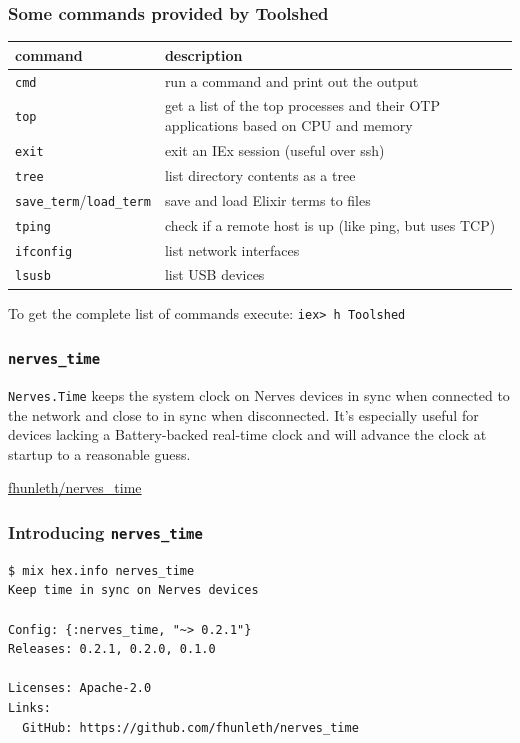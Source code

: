 \documentclass[10pt,xcolor=pdflatex,dvipsnames,table]{beamer}
\begin{document}
\begin{frame}
  \frametitle{Some commands provided by Toolshed}

  \begin{center}
  \begin{tabular}{|l|p{}|}\hline
    \textbf{command} & \textbf{description} \\ \hline
    \texttt{cmd} & run a command and print out the output \\
    \texttt{top} & get a list of the top processes and their OTP applications based on CPU and memory \\
    \texttt{exit} & exit an IEx session (useful over ssh) \\
    \texttt{tree} & list directory contents as a tree \\
    \texttt{save\_term}/\texttt{load\_term} & save and load Elixir terms to files \\
    \texttt{tping} & check if a remote host is up (like ping, but uses TCP) \\
    \texttt{ifconfig} & list network interfaces \\
    \texttt{lsusb} & list USB devices \\ \hline
  \end{tabular}
\end{center}

  To get the complete list of commands execute: \texttt{iex> h Toolshed}
\end{frame}

\begin{frame}[standout]
  \frametitle{\texttt{nerves\_time}}

  {\color{white}
  \texttt{Nerves.Time} keeps the system clock on Nerves devices in sync when
  connected to the network and close to in sync when disconnected. It's
  especially useful for devices lacking a Battery-backed real-time clock and
  will advance the clock at startup to a reasonable guess.

  \faGithub \hspace{1pt} \href{https://github.com/fhunleth/nerves_time}{fhunleth/nerves\_time}
  }

\end{frame}

\begin{frame}[fragile]
\frametitle{Introducing \texttt{nerves\_time}}

\begin{example}
\begin{verbatim}
$ mix hex.info nerves_time
Keep time in sync on Nerves devices

Config: {:nerves_time, "~> 0.2.1"}
Releases: 0.2.1, 0.2.0, 0.1.0

Licenses: Apache-2.0
Links:
  GitHub: https://github.com/fhunleth/nerves_time
\end{verbatim}
\end{example}
\end{frame}
\end{document}
